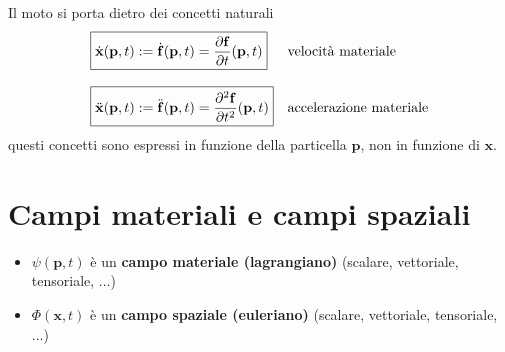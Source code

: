 \documentclass[10pt,a4paper,twoside]{book}
\begin{document}

Il moto si porta dietro dei concetti naturali
\begin{equation*}
\begin{array}{ l l }
\boxed{\dot{\mathbf{x}} (\mathbf{p} ,t):=\dot{\mathbf{f}} (\mathbf{p} ,t)=\frac{\partial \mathbf{f}}{\partial t} (\mathbf{p} ,t)} & \text{velocità materiale}\\\\
\boxed{\ddot{\mathbf{x}} (\mathbf{p} ,t):=\ddot{\mathbf{f}} (\mathbf{p} ,t)=\frac{\partial ^{2}\mathbf{f}}{\partial t^{2}} (\mathbf{p} ,t)} & \text{accelerazione materiale}
\end{array}
\end{equation*}
questi concetti sono espressi in funzione della particella $\mathbf{p}$, non in funzione di $\mathbf{x}$.
\section{Campi materiali e campi spaziali}
\begin{itemize}
\item $\psi (\mathbf{p} ,t)$ è un \textbf{campo materiale (lagrangiano)} (scalare, vettoriale, tensoriale, ...)
\item $\Phi (\mathbf{x} ,t)$ è un \textbf{campo spaziale (euleriano) }(scalare, vettoriale, tensoriale, ...)
\end{itemize}
\end{document}
